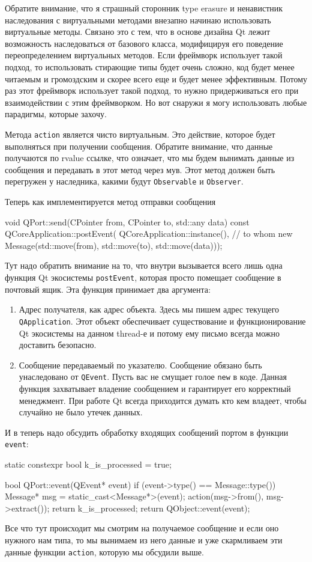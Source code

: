 Обратите внимание, что я страшный сторонник type erasure и ненавистник наследования с виртуальными методами внезапно начинаю использовать виртуальные методы.
Связано это с тем, что в основе дизайна Qt лежит возможность наследоваться от базового класса, модифицируя его поведение переопределением виртуальных методов.
Если фреймворк использует такой подход, то использовать стирающие типы будет очень сложно, код будет менее читаемым и громоздским и скорее всего еще и будет менее эффективным.
Потому раз этот фреймворк использует такой подход, то нужно придерживаться его при взаимодействии с этим фреймворком.
Но вот снаружи я могу использовать любые парадигмы, которые захочу.

Метода \verb"action" является чисто виртуальным.
Это действие, которое будет выполняться при получении сообщения.
Обратите внимание, что данные получаются по rvalue ссылке, что означает, что мы будем вынимать данные из сообщения и передавать в этот метод через мув.
Этот метод должен быть перегружен у наследника, какими будут \verb"Observable" и \verb"Observer".

Теперь как имплементируется метод отправки сообщения
\begin{cppcode}
void QPort::send(CPointer from, CPointer to, std::any data) const {
  QCoreApplication::postEvent(
      QCoreApplication::instance(), // to whom
      new Message(std::move(from), std::move(to), std::move(data)));
}
\end{cppcode}
Тут надо обратить внимание на то, что внутри вызывается всего лишь одна функция Qt экосистемы \verb"postEvent", которая просто помещает сообщение в почтовый ящик.
Эта функция принимает два аргумента:
\begin{enumerate}
\item Адрес получателя, как адрес объекта.
Здесь мы пишем адрес текущего \verb"QApplication".
Этот объект обеспечивает существование и функционирование Qt экосистемы на данном thread-е и потому ему письмо всегда можно доставить безопасно.

\item Сообщение передаваемый по указателю.
Сообщение обязано быть унаследовано от \verb"QEvent".
Пусть вас не смущает голое \verb"new" в коде.
Данная функция захватывает владение сообщением и гарантирует его корректный менеджмент.
При работе Qt всегда приходится думать кто кем владеет, чтобы случайно не было утечек данных.
\end{enumerate}

И в теперь надо обсудить обработку входящих сообщений портом в функции \verb"event":
\begin{cppcode}
static constexpr bool k_is_processed = true;

bool QPort::event(QEvent* event) {
  if (event->type() == Message::type()) {
    Message* msg = static_cast<Message*>(event);
    action(msg->from(), msg->extract());
    return k_is_processed;
  }
  return QObject::event(event);
}
\end{cppcode}
Все что тут происходит мы смотрим на получаемое сообщение и если оно нужного нам типа, то мы вынимаем из него данные и уже скармливаем эти данные функции \verb"action", которую мы обсудили выше.

